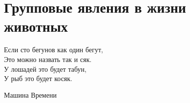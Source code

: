 \chapter{Групповые явления в жизни животных} %
\label{cha:NatureFlocking}

\epigraph{Если сто бегунов как один бегут,\\
Это можно назвать так и сяк.\\
У лошадей это будет табун,\\
У рыб это будет косяк.}{Машина Времени}




